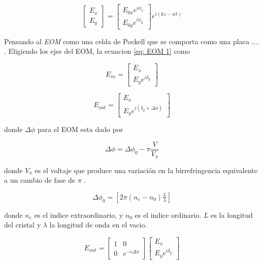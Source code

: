 				\begin{equation}
				\begin{bmatrix}
				E_x\\
				E_y
				\end{bmatrix}
				=
				\begin{bmatrix}
				E_{0x}e^{i\phi_x}\\
				E_{0y}e^{i\phi_y}
				\end{bmatrix}
				e^{i(kz-wt)}
				\label{eq: EOM 1}
				\end{equation}
				
				Pensando al \textit{EOM} como una celda de Pockell que se comporta como una placa .... .
				Eligiendo los ejes del EOM, la ecuacion \ref{eq: EOM 1} como
				
				\begin{equation}
				E_{in}=
				\begin{bmatrix}
				E_{x}\\
				E_{y}e^{i\delta_y}
				\end{bmatrix}
				\label{eq: EOM 2}
				\end{equation}
				
				\begin{equation}
				E_{out}=
				\begin{bmatrix}
				E_{x}\\
				E_{y}e^{i(\delta_y + \Delta \phi)}
				\end{bmatrix}
				\label{eq: EOM 3}
				\end{equation}
				
				donde $\Delta \phi $ para el EOM esta dado por 
				
				\begin{equation}
				\Delta \phi = \Delta \phi_0 - \pi \frac{V}{V_{\pi}}
				\end{equation}
				
				donde $V_{\pi}$ es el voltaje que produce una variación en la birrefringencia equivalente a un cambio de fase de $\pi $ .
				
				\[ \Delta \phi_0 =[2\pi(n_e-n_0)\tfrac{L}{\lambda}] \]
				
				donde $n_e$ es el indice extraordinario, y $n_0$ es el indice ordinario. $ L$ es la longitud del cristal y $\lambda $ la longitud de onda en el vacio.
				
				
				\begin{equation}
				E_{out}=
				\begin{bmatrix}
				1 & 0\\
				0 & e^{-i\Delta \phi}
				\end{bmatrix}
				\begin{bmatrix}
				E_{x}\\
				E_{y}e^{i\delta_y }
				\end{bmatrix}
				\label{eq: EOM 4}
				\end{equation}
				
